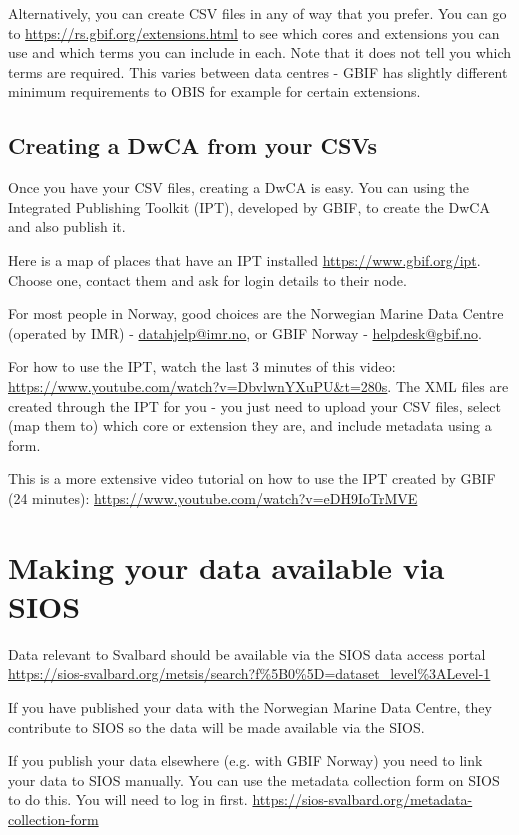 \documentclass[a4paper,english, 11pt]{article}
\begin{document}
Alternatively, you can create CSV files in any of way that you prefer. You can go to \url{https://rs.gbif.org/extensions.html} to see which cores and extensions you can use and which terms you can include in each. Note that it does not tell you which terms are required. This varies between data centres - GBIF has slightly different minimum requirements to OBIS for example for certain extensions.

\subsection{Creating a DwCA from your CSVs}
\label{ss:csv2dwca}

Once you have your CSV files, creating a DwCA is easy. You can using the Integrated Publishing Toolkit (IPT), developed by GBIF, to create the DwCA and also publish it.

Here is a map of places that have an IPT installed \url{https://www.gbif.org/ipt}. Choose one, contact them and ask for login details to their node.

For most people in Norway, good choices are the Norwegian Marine Data Centre (operated by IMR) - \href{mailto:datahjelp@imr.no }{datahjelp@imr.no}, or GBIF Norway - \href{mailto:helpdesk@gbif.no}{helpdesk@gbif.no}.

For how to use the IPT, watch the last 3 minutes of this video: \url{https://www.youtube.com/watch?v=DbvlwnYXuPU&t=280s}. The XML files are created through the IPT for you - you just need to upload your CSV files, select (map them to) which core or extension they are, and include metadata using a form.

This is a more extensive video tutorial on how to use the IPT created by GBIF (24 minutes): \url{https://www.youtube.com/watch?v=eDH9IoTrMVE}
 
\section{Making your data available via SIOS}
\label{s:sios}

Data relevant to Svalbard should be available via the SIOS data access portal \url{https://sios-svalbard.org/metsis/search?f%5B0%5D=dataset_level%3ALevel-1}

If you have published your data with the Norwegian Marine Data Centre, they contribute to SIOS so the data will be made available via the SIOS.

If you publish your data elsewhere (e.g. with GBIF Norway) you need to link your data to SIOS manually. You can use the metadata collection form on SIOS to do this. You will need to log in first. \url{https://sios-svalbard.org/metadata-collection-form}
\end{document}
